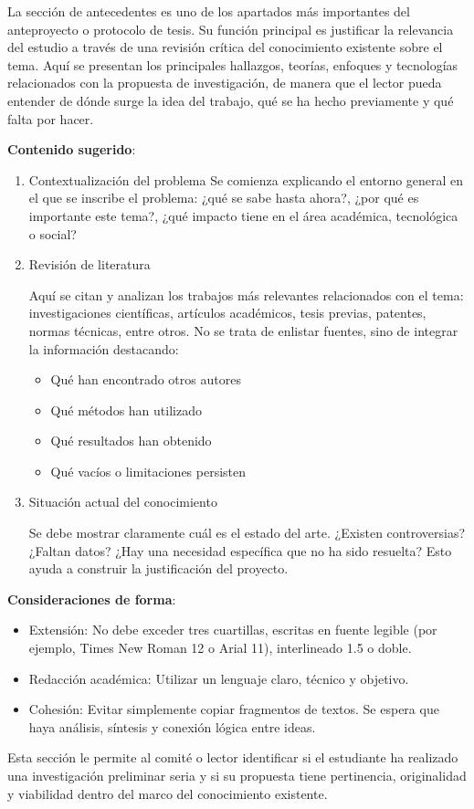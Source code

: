 La sección de antecedentes es uno de los apartados más importantes del anteproyecto o protocolo de tesis. Su función principal es justificar la relevancia del estudio a través de una revisión crítica del conocimiento existente sobre el tema. Aquí se presentan los principales hallazgos, teorías, enfoques y tecnologías relacionados con la propuesta de investigación, de manera que el lector pueda entender de dónde surge la idea del trabajo, qué se ha hecho previamente y qué falta por hacer.

\textbf{Contenido sugerido}:

\begin{enumerate}
    \item Contextualización del problema
    Se comienza explicando el entorno general en el que se inscribe el problema: ¿qué se sabe hasta ahora?, ¿por qué es importante este tema?, ¿qué impacto tiene en el área académica, tecnológica o social?

    \item Revisión de literatura

    Aquí se citan y analizan los trabajos más relevantes relacionados con el tema: investigaciones científicas, artículos académicos, tesis previas, patentes, normas técnicas, entre otros. No se trata de enlistar fuentes, sino de integrar la información destacando:

    \begin{itemize}
        \item Qué han encontrado otros autores
        \item Qué métodos han utilizado
        \item Qué resultados han obtenido
        \item Qué vacíos o limitaciones persisten
    \end{itemize}

    \item Situación actual del conocimiento

    Se debe mostrar claramente cuál es el estado del arte. ¿Existen controversias? ¿Faltan datos? ¿Hay una necesidad específica que no ha sido resuelta? Esto ayuda a construir la justificación del proyecto.
\end{enumerate}

\textbf{Consideraciones de forma}:

\begin{itemize}
    \item Extensión: No debe exceder tres cuartillas, escritas en fuente legible (por ejemplo, Times New Roman 12 o Arial 11), interlineado 1.5 o doble.
    \item Redacción académica: Utilizar un lenguaje claro, técnico y objetivo.
    \item Cohesión: Evitar simplemente copiar fragmentos de textos. Se espera que haya análisis, síntesis y conexión lógica entre ideas.
\end{itemize}

Esta sección le permite al comité o lector identificar si el estudiante ha realizado una investigación preliminar seria y si su propuesta tiene pertinencia, originalidad y viabilidad dentro del marco del conocimiento existente.